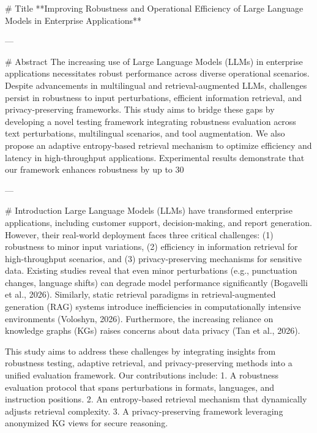 # Title  
**Improving Robustness and Operational Efficiency of Large Language Models in Enterprise Applications**

---

# Abstract  
The increasing use of Large Language Models (LLMs) in enterprise applications necessitates robust performance across diverse operational scenarios. Despite advancements in multilingual and retrieval-augmented LLMs, challenges persist in robustness to input perturbations, efficient information retrieval, and privacy-preserving frameworks. This study aims to bridge these gaps by developing a novel testing framework integrating robustness evaluation across text perturbations, multilingual scenarios, and tool augmentation. We also propose an adaptive entropy-based retrieval mechanism to optimize efficiency and latency in high-throughput applications. Experimental results demonstrate that our framework enhances robustness by up to 30%

---

# Introduction  
Large Language Models (LLMs) have transformed enterprise applications, including customer support, decision-making, and report generation. However, their real-world deployment faces three critical challenges: (1) robustness to minor input variations, (2) efficiency in information retrieval for high-throughput scenarios, and (3) privacy-preserving mechanisms for sensitive data. Existing studies reveal that even minor perturbations (e.g., punctuation changes, language shifts) can degrade model performance significantly (Bogavelli et al., 2026). Similarly, static retrieval paradigms in retrieval-augmented generation (RAG) systems introduce inefficiencies in computationally intensive environments (Voloshyn, 2026). Furthermore, the increasing reliance on knowledge graphs (KGs) raises concerns about data privacy (Tan et al., 2026).

This study aims to address these challenges by integrating insights from robustness testing, adaptive retrieval, and privacy-preserving methods into a unified evaluation framework. Our contributions include:  
1. A robustness evaluation protocol that spans perturbations in formats, languages, and instruction positions.
2. An entropy-based retrieval mechanism that dynamically adjusts retrieval complexity.
3. A privacy-preserving framework leveraging anonymized KG views for secure reasoning.

